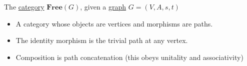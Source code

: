 The \hyperref[D3.6]{category} $\mathbf{Free}(G)$, given a \hyperref[D1.36]{graph} $G=(V,A,s,t)$

\begin{itemize}
    \item  A category whose objects are vertices and morphisms are paths.
    \item The identity morphism is the trivial path at any vertex.
    \item Composition is path concatenation (this obeys unitality and associativity)
  \end{itemize}
